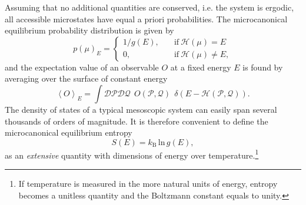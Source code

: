 \documentclass[12pt]{report}
\begin{document}
Assuming that no additional quantities are conserved, i.e. the system is ergodic, all accessible microstates have equal a priori probabilities\cite{Kardar2007}. The microcanonical equilibrium probability distribution is given by 
\begin{equation}
p(\mu)_{E} = \left\{
\begin{array}{lr}
1/g(E), & \quad
\mathrm{if} \: \mathcal{H(\mu)} = E\\
0, & \quad \mathrm{if} \: \mathcal{H(\mu)} \neq E,
\end{array}
\right.
\end{equation}
and the expectation value of an observable $O$ at a fixed energy $E$ is found by averaging over the surface of constant energy
\begin{equation}
\left< O \right>_{E} = \int \mathcal{DP}\mathcal{DQ} \:\: O(\mathcal{P},\mathcal{Q}) \:\: \delta(E - \mathcal{H}(\mathcal{P},\mathcal{Q})).
\end{equation}
The density of states of a typical mesoscopic system can easily span several thousands of orders of magnitude. It is therefore convenient to define the microcanonical equilibrium entropy
\begin{equation}
S(E) = k_\mathrm{B}\, \mathrm{ln}\, g(E),
\end{equation}
as an \textit{extensive} quantity with dimensions of energy over temperature.\footnote{If temperature is measured in the more natural units of energy, entropy becomes a unitless quantity and the Boltzmann constant equals to unity.}
\end{document}
